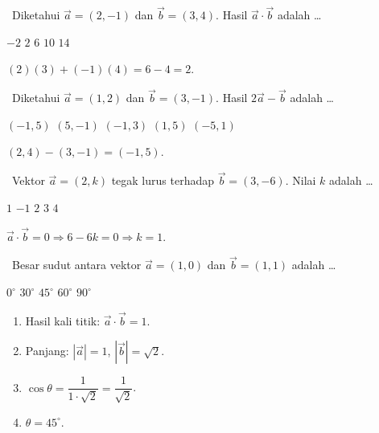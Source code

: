 \documentclass[11pt,a4paper]{exam}
\newenvironment{langkah}{%
  \begin{enumerate}[label=\textbf{Langkah \arabic*:},leftmargin=2.6em,
    itemsep=2pt,topsep=2pt]}{\end{enumerate}}
\newcommand{\Inter}{{\footnotesize\textsf{\textcolor{biru}{[Intermediate]}}}\ }
\newcommand{\Adv}{{\footnotesize\textsf{\textcolor{oranye}{[Advanced]}}}\ }
\begin{document}
\begin{questions}
\question \Inter Diketahui $\vec{a} = (2,-1)$ dan $\vec{b} = (3,4)$. Hasil $\vec{a}\cdot\vec{b}$ adalah \dots
\begin{choices}
\choice $-2$ \CorrectChoice $2$ \choice $6$ \choice $10$ \choice $14$
\end{choices}
\begin{solution}$(2)(3) + (-1)(4) = 6 - 4 = 2.$\end{solution}

\question \Inter Diketahui $\vec{a} = (1,2)$ dan $\vec{b} = (3,-1)$. Hasil $2\vec{a} - \vec{b}$ adalah \dots
\begin{choices}
\CorrectChoice $(-1,5)$ \choice $(5,-1)$ \choice $(-1,3)$ \choice $(1,5)$ \choice $(-5,1)$
\end{choices}
\begin{solution}$(2,4) - (3,-1) = (-1,5).$\end{solution}

\question \Inter Vektor $\vec{a} = (2,k)$ tegak lurus terhadap $\vec{b} = (3,-6)$. Nilai $k$ adalah \dots
\begin{choices}
\CorrectChoice $1$ \choice $-1$ \choice $2$ \choice $3$ \choice $4$
\end{choices}
\begin{solution}$\vec{a}\cdot\vec{b}=0 \Rightarrow 6 - 6k = 0 \Rightarrow k = 1.$\end{solution}

\question \Adv Besar sudut antara vektor $\vec{a} = (1,0)$ dan $\vec{b} = (1,1)$ adalah \dots
\begin{choices}
\choice $0^\circ$ \choice $30^\circ$ \CorrectChoice $45^\circ$ \choice $60^\circ$ \choice $90^\circ$
\end{choices}
\begin{solution}
\begin{langkah}
\item Hasil kali titik: $\vec a\cdot\vec b = 1$.
\item Panjang: $|\vec a| = 1$, $|\vec b| = \sqrt2$.
\item $\cos\theta = \dfrac{1}{1\cdot\sqrt2} = \dfrac{1}{\sqrt2}$.
\item $\theta = 45^\circ$.
\end{langkah}
\end{solution}


\end{questions}
\end{document}
